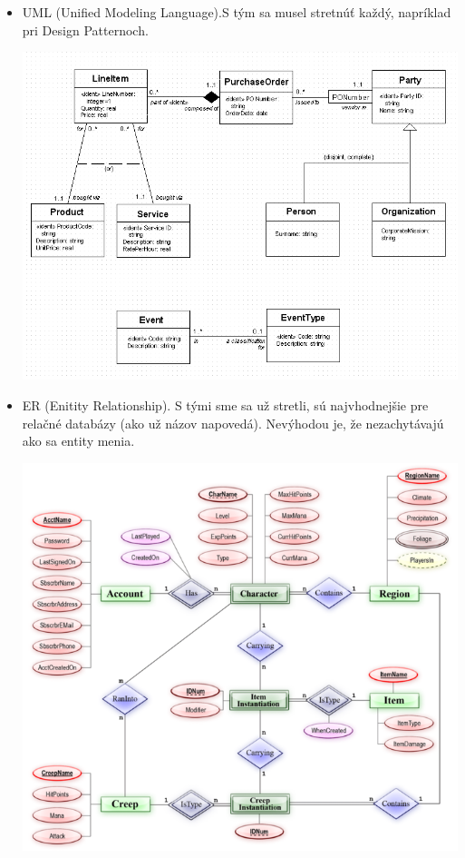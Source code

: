 \documentclass[10pt,a4paper]{article}
\begin{document}
\begin{itemize}
\begin{center}
\end{center}
\item UML (Unified Modeling Language).S tým sa musel stretnúť každý, napríklad pri Design Patternoch. 
\begin{center}
\includegraphics[scale=0.5]{db_uml.png}
\end{center}
\item ER (Enitity Relationship). S tými sme sa už stretli, sú najvhodnejšie pre relačné databázy (ako už názov napovedá). Nevýhodou je, že nezachytávajú ako sa entity menia. 
\begin{center}
\includegraphics[scale=0.5]{db_entity_relationship.png}
\end{center}
\end{itemize}
\end{document}
